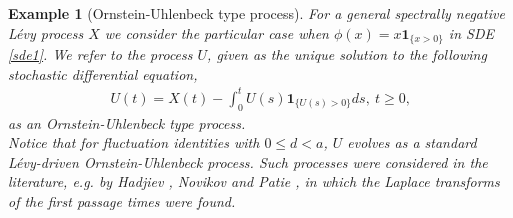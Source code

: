 \documentclass[12pt,reqno]{amsart}
\newcommand{\blue}{\textcolor[rgb]{0.00,0.00,1.00}}
\newcommand{\green}{\textcolor[rgb]{0.00,0.70,.30}}
\newtheorem{example}{Example}
\theoremstyle{definition}
\theoremstyle{remark}
\newcommand{\ind}{\mathbf{1}}
\newcommand{\md}{\mathrm{d}}
\begin{document}
\begin{example}[Ornstein-Uhlenbeck type process]
For a general spectrally negative L\'evy process $X$ we consider the particular case when $\phi(x)=x\ind_{\{x> 0\}}$ %
in SDE \eqref{sde1}. We refer to the process $U$, given as the unique solution to the following stochastic differential equation,
\begin{align*}
U(t)=X(t)-\int_0^tU(s)\ind_{\{U(s)>0\}}ds,\ \text{$t\geq 0$,}
\end{align*}
as an Ornstein-Uhlenbeck type process. \\

Notice that for fluctuation identities with $0\le d<a$, $U$ evolves as a standard L\'evy-driven
Ornstein-Uhlenbeck process. Such processes were considered in the literature, e.g. by Hadjiev \cite{hadjiev}, Novikov \cite{novikov} and Patie \cite{patie1}, in which the Laplace transforms of the first passage times were found.\\



\end{example}
\end{document}
